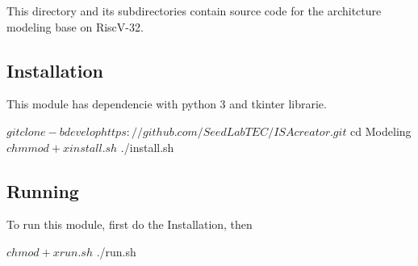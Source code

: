 This directory and its subdirectories contain source code for the architcture modeling base on Risc\+V-\/32.

\subsection*{Installation }

This module has dependencie with python 3 and tkinter librarie. \begin{DoxyVerb}$ git clone -b develop https://github.com/SeedLabTEC/ISAcreator.git
$ cd Modeling
$ chmmod +x install.sh
$ ./install.sh
\end{DoxyVerb}


\subsection*{Running }

To run this module, first do the Installation, then \begin{DoxyVerb}$ chmod +x run.sh
$ ./run.sh \end{DoxyVerb}
 